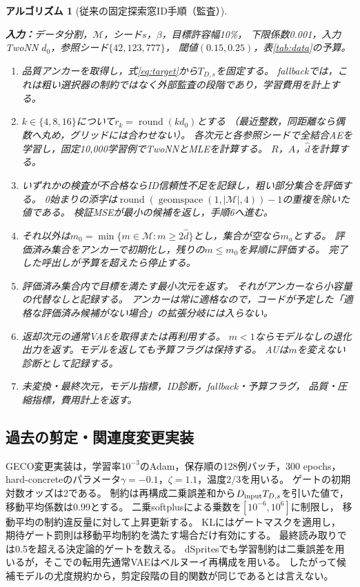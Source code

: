 \documentclass[11pt,a4paper]{ltjsarticle}
\newtheorem{Algorithm}{アルゴリズム}
\begin{document}
\noindent\begin{minipage}{\linewidth}
\begin{Algorithm}[従来の固定探索窓ID手順（監査）]
\label{alg:legacy}\normalfont\small\leavevmode\par\noindent
\textbf{入力：}データ分割，$\mathcal M$，シード$s$，$\beta$，目標許容幅10\%，
下限係数0.001，入力TwoNN $d_0$，参照シード$\{42,123,777\}$，
閾値$(0.15,0.25)$，表\ref{tab:data}の予算。
\begin{enumerate}
\item 品質アンカーを取得し，式\eqref{eq:target}から$T_{D,s}$を固定する。
fallbackでは，これは粗い選択器の制約ではなく外部監査の段階であり，学習費用を計上する。
\item $k\in\{4,8,16\}$について$r_k=\operatorname{round}(kd_0)$とする
（最近整数，同距離なら偶数へ丸め，グリッドには合わせない）。
各次元と各参照シードで全結合AEを学習し，固定10,000学習例でTwoNNとMLEを計算する。
$R$，$A$，$\hat d$を計算する。
\item いずれかの検査が不合格ならID信頼性不足を記録し，粗い部分集合を評価する。
0始まりの添字は$\operatorname{round}(\operatorname{geomspace}(1,|\mathcal M|,4))-1$の重複を除いた値である。
検証MSEが最小の候補を返し，手順6へ進む。
\item それ以外は$m_0=\min\{m\in\mathcal M:m\ge2\hat d\}$とし，集合が空なら$m_a$とする。
評価済み集合をアンカーで初期化し，残りの$m\le m_0$を昇順に評価する。
完了した呼出しが予算を超えたら停止する。
\item 評価済み集合内で目標を満たす最小次元を返す。
それがアンカーなら小容量の代替なしと記録する。
アンカーは常に適格なので，コードが予定した「適格な評価済み候補が\emph{ない}場合」の拡張分岐には入らない。
\item 返却次元の通常VAEを取得または再利用する。
$m<1$ならモデルなしの退化出力を返す。モデルを返しても予算フラグは保持する。
AUは$m$を変えない診断として記録する。
\item 未変換・最終次元，モデル指標，ID診断，fallback・予算フラグ，
品質・圧縮指標，費用計上を返す。
\end{enumerate}
\end{Algorithm}
\end{minipage}

\subsection{過去の剪定・関連度変更実装}\label{app:adaptations}
GECO変更実装は，学習率$10^{-3}$のAdam，保存順の128例バッチ，300 epochs，
hard-concreteのパラメータ$\gamma=-0.1$，$\zeta=1.1$，温度$2/3$を用いる。
ゲートの初期対数オッズは2である。
制約は再構成二乗誤差和から$D_{\rm input}T_{D,s}$を引いた値で，
移動平均係数は0.99とする。
二乗softplusによる乗数を$[10^{-6},10^6]$に制限し，
移動平均の制約違反量に対して上昇更新する。
KLにはゲートマスクを適用し，
期待ゲート罰則は移動平均制約を満たす場合だけ有効にする。
最終読み取りでは0.5を超える決定論的ゲートを数える。
dSpritesでも学習制約は二乗誤差を用いるが，そこでの転用先通常VAEはベルヌーイ再構成を用いる。
したがって候補モデルの尤度規約から，剪定段階の目的関数が同じであるとは言えない。
\end{document}
